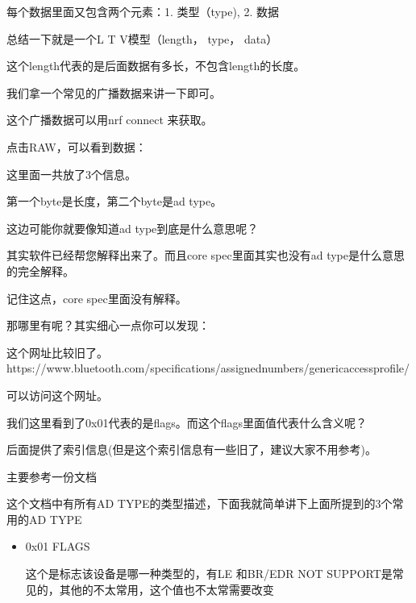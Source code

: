 \documentclass[letterpaper,10pt,english]{sphinxmanual}
\begin{document}
每个数据里面又包含两个元素：1. 类型（type), 2. 数据

总结一下就是一个L T V模型（length， type， data）

这个length代表的是后面数据有多长，不包含length的长度。

我们拿一个常见的广播数据来讲一下即可。

这个广播数据可以用nrf connect 来获取。


点击RAW，可以看到数据：


\begin{sphinxVerbatim}[commandchars=\\\{\}]
   
    
  
\end{sphinxVerbatim}

这里面一共放了3个信息。

第一个byte是长度，第二个byte是ad type。

这边可能你就要像知道ad type到底是什么意思呢？

其实软件已经帮您解释出来了。而且core spec里面其实也没有ad type是什么意思的完全解释。

记住这点，core spec里面没有解释。

那哪里有呢？其实细心一点你可以发现：


这个网址比较旧了。https://www.bluetooth.com/specifications/assigned\sphinxhyphen{}numbers/generic\sphinxhyphen{}access\sphinxhyphen{}profile/

可以访问这个网址。


我们这里看到了0x01代表的是flags。而这个flags里面值代表什么含义呢？

后面提供了索引信息(但是这个索引信息有一些旧了，建议大家不用参考)。

主要参考一份文档

这个文档中有所有AD TYPE的类型描述，下面我就简单讲下上面所提到的3个常用的AD TYPE
\begin{itemize}
\item {} 
0x01 FLAGS

这个是标志该设备是哪一种类型的，有LE 和BR/EDR NOT SUPPORT是常见的，其他的不太常用，这个值也不太常需要改变

\end{itemize}
\end{document}
